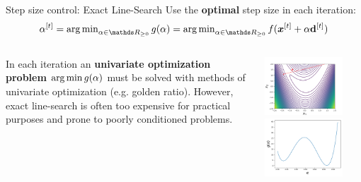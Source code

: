 	\begin{vbframe}{Step size control: Exact Line-Search}
		Use the \textbf{optimal} step size in each iteration:
		\vspace*{-0.1cm}
		$$ \alpha^{[t]} = \argmin_{\alpha \in \R_{\ge 0}} g(\alpha) = \argmin_{\alpha \in \R_{\ge 0}} f(\bm{x}^{[t]} + \alpha \mathbf{d}^{[t]})$$
		\begin{columns}
			\begin{column}{0.48\textwidth}
				
				\vspace*{-0.2cm}
				In each iteration an \textbf{univariate optimization problem} $\operatorname{arg\,min} g(\alpha)$ must be solved with methods of univariate optimization (e.g. golden ratio). However, exact line-search is often too expensive for practical purposes and prone to poorly conditioned problems.
			\end{column}
			\begin{column}{0.48\textwidth}
				\vspace*{-1cm}
				\begin{center}
					\includegraphics[width = 0.8\textwidth]{figure_man/line_search_rosenbrock.png} \\
					\includegraphics[width = 0.8\textwidth]{figure_man/line_search_rosenbrock_alpha.png}
				\end{center}
			\end{column}
		\end{columns}
	\end{vbframe}
	
